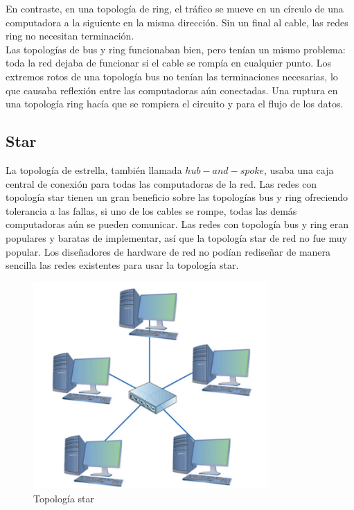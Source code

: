 \documentclass[12pt]{report}
\begin{document}
En contraste, en una topología de ring, el tráfico se mueve en un círculo de una computadora 
a la siguiente en la misma dirección. Sin un final al cable, las redes ring no necesitan terminación.\\
Las topologías de bus y ring funcionaban bien, pero tenían un mismo problema: toda la red 
dejaba de funcionar si el cable se rompía en cualquier punto. Los extremos rotos de 
una topología bus no tenían las terminaciones necesarias, lo que causaba reflexión entre 
las computadoras aún conectadas. Una ruptura en una topología ring hacía que se rompiera el
circuito y para el flujo de los datos.

\subsection{Star}
La topología de estrella, también llamada $hub-and-spoke$, usaba una caja central 
de conexión para todas las computadoras de la red. Las redes con topología star 
tienen un gran beneficio sobre las topologías bus y ring ofreciendo tolerancia a
las fallas, si uno de los cables se rompe, todas las demás computadoras aún se 
pueden comunicar. Las redes con topología bus y ring eran populares y baratas de
implementar, así que la topología star de red no fue muy popular. 
Los diseñadores de hardware de red no podían rediseñar de manera sencilla las redes
existentes para usar la topología star.

\begin{figure}[h]
\centering
\includegraphics[width=0.8\textwidth]{Star.jpg}
\caption{Topología star}
\end{figure}
\end{document}
